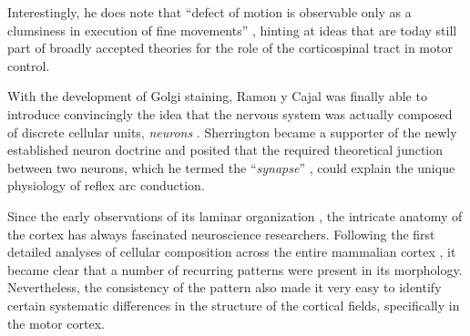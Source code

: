 Interestingly, he does note that \enquote{defect of motion is observable only as a clumsiness in execution of fine movements} \cite{Sherrington1885}, hinting at ideas that are today still part of broadly accepted theories for the role of the corticospinal tract in motor control.

With the development of Golgi staining, Ramon y Cajal was finally able to introduce convincingly the idea that the nervous system was actually composed of discrete cellular units, \emph{neurons} \cite{RamonYCajal1894}. Sherrington became a supporter of the newly established neuron doctrine and posited that the required theoretical junction between two neurons, which he termed the ``\emph{synapse}'' \cite{Foster1897}, could explain the unique physiology of reflex arc conduction.

Since the early observations of its laminar organization \cite{Baillarger1840}, the intricate anatomy of the cortex has always fascinated neuroscience researchers. Following the first detailed analyses of cellular composition across the entire mammalian cortex \cite{Campbell1905,Brodmann1909}, it became clear that a number of recurring patterns were present in its morphology. Nevertheless, the consistency of the pattern also made it very easy to identify certain systematic differences in the structure of the cortical fields, specifically in the motor cortex.

